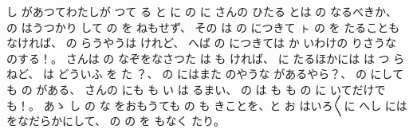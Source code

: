 し
があつてわたしが
つて
る
と
に
の
に
さんの
ひたる
とは
の
なるべきか、
の
はうつかり
して
の
を
ねもせず、
その
は
の
につきて
ㇳ
の
を
たることもなければ、
の
らうやうは
けれど、
へば
の
につきては
か
いわけの
りさうな
のする！。
さんは
の
なぞをなさつた
は
も
ければ、
に
たるほかには
は
つ
らねど、
は
どういふ
を
た
？、
の
にはまた
のやうな
があるやら？、
の
にしても
の
がある、
さんの
にも
も
い
は
るまい、
の
は
も
も
の
に
いてだけでも！。
あゝ
し
の
な
をおもうても
の
も
きことを、と
お
はいろ〳〵に
へし
には
をなだらかにして、
の
の
を
もなく
たり。

